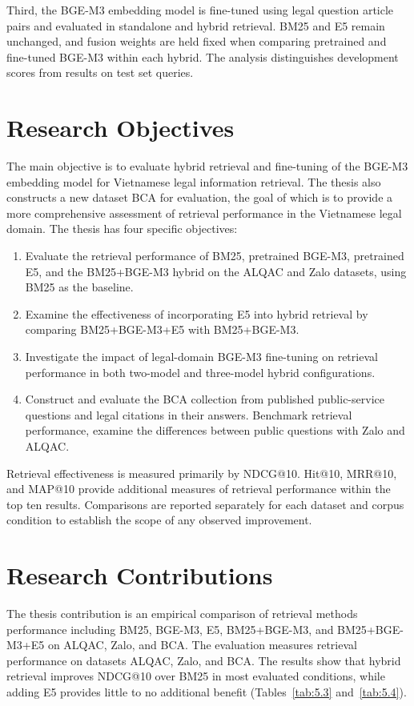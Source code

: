 Third, the BGE-M3 embedding model is fine-tuned using legal question article pairs and evaluated in standalone and hybrid retrieval. BM25 and E5 remain unchanged, and fusion weights are held fixed when comparing pretrained and fine-tuned BGE-M3 within each hybrid. The analysis distinguishes development scores from results on test set queries.

\section{Research Objectives}

The main objective is to evaluate hybrid retrieval and fine-tuning of the BGE-M3 embedding model for Vietnamese legal information retrieval. The thesis also constructs a new dataset BCA for evaluation, the goal of which is to provide a more comprehensive assessment of retrieval performance in the Vietnamese legal domain. The thesis has four specific objectives:

\begin{enumerate}
    \item Evaluate the retrieval performance of BM25, pretrained BGE-M3, pretrained E5, and the BM25+BGE-M3 hybrid on the ALQAC and Zalo datasets, using BM25 as the baseline.
    \item Examine the effectiveness of incorporating E5 into hybrid retrieval by comparing BM25+BGE-M3+E5 with BM25+BGE-M3.
    \item  Investigate the impact of legal-domain BGE-M3 fine-tuning on retrieval performance in both two-model and three-model hybrid configurations.
    \item Construct and evaluate the BCA collection from published public-service questions and legal citations in their answers. Benchmark retrieval performance, examine the differences between public questions with Zalo and ALQAC.
\end{enumerate}

Retrieval effectiveness is measured primarily by NDCG@10. Hit@10, MRR@10, and MAP@10 provide additional measures of retrieval performance within the top ten results. Comparisons are reported separately for each dataset and corpus condition to establish the scope of any observed improvement.

\section{Research Contributions}

The thesis contribution is an empirical comparison of retrieval methods performance including BM25, BGE-M3, E5, BM25+BGE-M3, and BM25+BGE-M3+E5 on ALQAC, Zalo, and BCA. The evaluation measures retrieval performance on datasets ALQAC, Zalo, and BCA. The results show that hybrid retrieval improves NDCG@10 over BM25 in most evaluated conditions, while adding E5 provides little to no additional benefit (Tables~\ref{tab:5.3} and~\ref{tab:5.4}).

